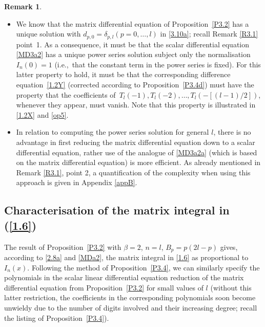 \documentclass[pdftex]{sigma}
\numberwithin{equation}{section}
\theoremstyle{definition}
\newtheorem{Remark}[Theorem]{Remark}
\begin{document}
\begin{Remark}\label{R4.1} \quad
\begin{itemize}\itemsep=0pt
\item[(1)] We know that the matrix differential equation of
Proposition~\ref{P3.2} has a unique solution with
$d_{p,0} = \delta_{p,l} (p=0,\dots,l)$ in \eqref{3.10a};
recall Remark \ref{R3.1} point~1. As a consequence, it must be that the scalar differential equation \eqref{MD3a2} has a unique power series solution subject only the normalisation $I_n(0) = 1$
(i.e.,~that the constant term in the power series is fixed). For this latter property to hold, it must be that the corresponding difference equation~\eqref{1.2Y} (corrected according to
Proposition~\ref{P3.4d}) must have the property that the coefficients of~${T_l(-1), T_l(-2),\dots, T_l(-[(l-1)/2])}$, whenever they appear, must vanish. Note that this property is illustrated in \eqref{1.2X} and \eqref{op5}.

\item[(2)] In relation to computing the power series solution {for general $l$}, there is no advantage in first reducing the matrix differential equation down to a scalar differential equation, rather use of the analogue of \eqref{MD3a2a} (which is based on the matrix differential equation) is more efficient. As already mentioned in Remark \ref{R3.1}, point 2, a quantification of the complexity when using this approach is given in Appendix \ref{appB}.
\end{itemize}
\end{Remark}


\subsection{Characterisation of the matrix integral in (\ref{1.6})}\label{S4.3}
The result of Proposition~\ref{P3.2} with
$\beta =2$, $n=l$, $B_p = p (2l-p)$ gives,
according to \eqref{2.8a} and \eqref{MDa2},
the matrix integral in \eqref{1.6} as proportional to $I_n(x)$.
 Following the method of Proposition~\ref{P3.4}, we can similarly specify the polynomials in the scalar linear differential equation reduction of the matrix differential equation from Proposition~\ref{P3.2} for small values of $l$ (without this latter restriction, the coefficients in the corresponding polynomials soon become unwieldy due to the number of digits involved and their increasing degree; recall the listing of
Proposition~\ref{P3.4}).
\end{document}
